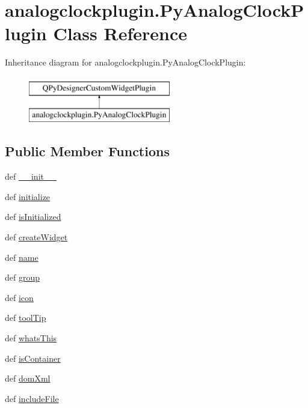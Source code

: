 \hypertarget{classanalogclockplugin_1_1PyAnalogClockPlugin}{}\section{analogclockplugin.\+Py\+Analog\+Clock\+Plugin Class Reference}
\label{classanalogclockplugin_1_1PyAnalogClockPlugin}
Inheritance diagram for analogclockplugin.\+Py\+Analog\+Clock\+Plugin\+:\begin{figure}[H]
\begin{center}
\leavevmode
\includegraphics[height=2.000000cm]{classanalogclockplugin_1_1PyAnalogClockPlugin}
\end{center}
\end{figure}
\subsection*{Public Member Functions}
\begin{DoxyCompactItemize}
\item 
def \hyperlink{classanalogclockplugin_1_1PyAnalogClockPlugin_a23036175e7aebd69f5d681c6375f09ad}{\+\_\+\+\_\+init\+\_\+\+\_\+}
\item 
def \hyperlink{classanalogclockplugin_1_1PyAnalogClockPlugin_a35baa2389f9f5612cc788acf2af48ee3}{initialize}
\item 
def \hyperlink{classanalogclockplugin_1_1PyAnalogClockPlugin_a441fe82b8fd6dc0997d8ec097fdfb604}{is\+Initialized}
\item 
def \hyperlink{classanalogclockplugin_1_1PyAnalogClockPlugin_a9ebca651aa1626c4591ce947dd3e84cf}{create\+Widget}
\item 
def \hyperlink{classanalogclockplugin_1_1PyAnalogClockPlugin_a747be3dda6fb9eef5f312f02124611da}{name}
\item 
def \hyperlink{classanalogclockplugin_1_1PyAnalogClockPlugin_a3cdd1a2d3f474eb0a5ba935ef0192570}{group}
\item 
def \hyperlink{classanalogclockplugin_1_1PyAnalogClockPlugin_a5f46e010cea57f427e614602cdcbe297}{icon}
\item 
def \hyperlink{classanalogclockplugin_1_1PyAnalogClockPlugin_af84d6d7c715547a4c43fb0e2bebdb5d6}{tool\+Tip}
\item 
def \hyperlink{classanalogclockplugin_1_1PyAnalogClockPlugin_afe64b744c1277eaf4535f2e9b1a81039}{whats\+This}
\item 
def \hyperlink{classanalogclockplugin_1_1PyAnalogClockPlugin_a65b5f76b35beea91412ba139937b156b}{is\+Container}
\item 
def \hyperlink{classanalogclockplugin_1_1PyAnalogClockPlugin_ad5dbaa3426d12bea5991196473a7fd64}{dom\+Xml}
\item 
def \hyperlink{classanalogclockplugin_1_1PyAnalogClockPlugin_aa7e6a930668970bce35667806ab4f0df}{include\+File}
\end{DoxyCompactItemize}
